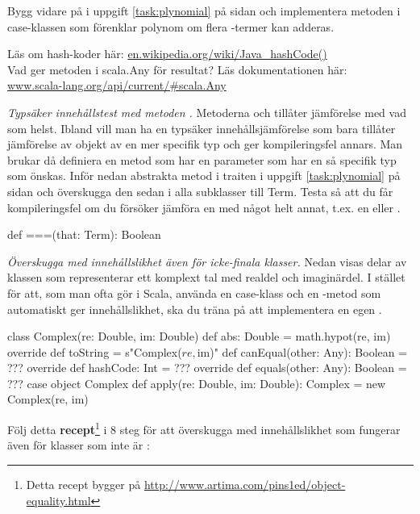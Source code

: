 \clearpage

\AdvancedTasks %

\Task Bygg vidare på  i uppgift \ref{task:plynomial} på sidan \pageref{task:plynomial} och implementera metoden  i case-klassen  som förenklar polynom om flera -termer kan adderas.

\Task\Pen Läs om hash-koder här: \href{https://en.wikipedia.org/wiki/Java_hashCode()}{en.wikipedia.org/wiki/Java\_hashCode()} \\
Vad ger metoden \code{##} i scala.Any för resultat? Läs dokumentationen här: \\ \href{http://www.scala-lang.org/api/current/#scala.Any}{www.scala-lang.org/api/current/\#scala.Any}

\Task \emph{Typsäker innehållstest med metoden \code{===}.} Metoderna  och \code{==} tillåter jämförelse med vad som helst. Ibland vill man ha en typsäker innehållsjämförelse som bara tillåter jämförelse av objekt av en mer specifik typ och ger kompileringsfel annars. Man brukar då definiera en metod \code{===} som har en parameter  som har en så specifik typ som önskas. Inför nedan abstrakta metod \code{===} i traiten  i uppgift \ref{task:plynomial} på sidan \pageref{task:plynomial} och överskugga den sedan i alla subklasser till Term. Testa så att du får kompileringsfel om du försöker jämföra en  med något helt annat, t.ex. en  eller .
\begin{Code}
  def ===(that: Term): Boolean
\end{Code}


\Task \label{task:equals:Complex} \emph{Överskugga  med innehållslikhet även för icke-finala klasser.} Nedan visas delar av klassen  som representerar ett komplext tal med realdel och imaginärdel. I stället för att, som man ofta gör i Scala, använda en case-klass och en -metod som automatiskt ger innehållslikhet, ska du träna på att implementera en egen . 
\begin{Code}
class Complex(re: Double, im: Double) {
  def abs: Double = math.hypot(re, im)
  override def toString = s"Complex($re, $im)"
  def canEqual(other: Any): Boolean = ???
  override def hashCode: Int  = ??? 
  override def equals(other: Any): Boolean = ???
}
case object Complex {
  def apply(re: Double, im: Double): Complex = new Complex(re, im)
}
\end{Code}
Följ detta \textbf{recept}\footnote{Detta recept bygger på \url{http://www.artima.com/pins1ed/object-equality.html}} i 8 steg för att överskugga  med innehållslikhet som fungerar även för klasser som inte är :

